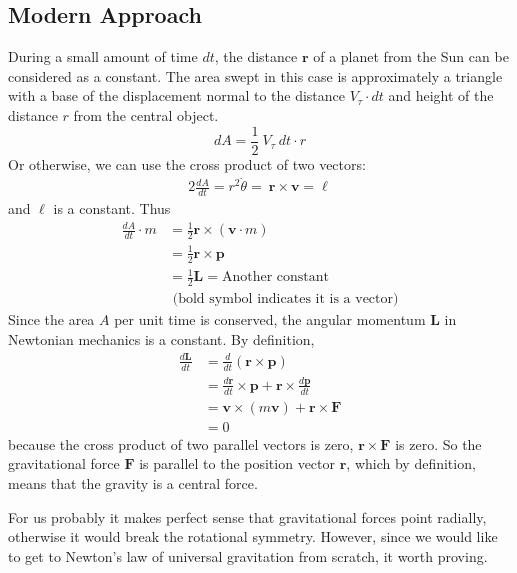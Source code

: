 \documentclass{article}
\begin{document}
\subsection{Modern Approach}
During a small amount of time $dt$, the distance $\boldsymbol{r}$ of a planet from the Sun can be considered as a constant. The area swept in this case is approximately a triangle with a base of the displacement normal to the distance $V_\tau \cdot dt$ and height of the distance $r$ from the central object. 
\[dA = \frac{1}{2}\ V_\tau\ dt\cdot r\]
Or otherwise, we can use the cross product of two vectors:
\begin{align*}
    \label{eq:1}
    2\frac{dA}{dt}  = r^2 \dot{\theta} = \ \boldsymbol{r} \times \boldsymbol{v} = \ell
\end{align*}
and $\ell$ is a constant. Thus
\begin{align*}
    \frac{dA}{dt}\cdot m & =  \frac{1}{2}\boldsymbol{r} \times (\boldsymbol{v} \cdot m) 
    \\ & = \frac{1}{2}\boldsymbol{r} \times \boldsymbol{p} 
    \\ & = \frac{1}{2} \boldsymbol{L} = \text{Another constant}
    \\ & \text{ (bold symbol indicates it is a vector)}
\end{align*}
Since the area $A$ per unit time is conserved, the angular momentum $\boldsymbol{L}$ in Newtonian mechanics is a constant. 
By definition,
\begin{align*}
    \frac{d\boldsymbol{L}}{dt} & = \frac{d}{dt} (\boldsymbol{r} \times \boldsymbol{p})
    \\ &  = \frac{d\boldsymbol{r}}{dt} \times \boldsymbol{p} + \boldsymbol{r} \times \frac{d\boldsymbol{p}}{dt} 
    \\ & = \boldsymbol{v} \times (m\boldsymbol{v}) + \boldsymbol{r} \times \boldsymbol{F} 
    \\ & = 0
\end{align*}
because the cross product of two parallel vectors is zero, $\boldsymbol{r} \times \boldsymbol{F}$ is zero. So the gravitational force $\boldsymbol{F}$ is parallel to the position vector $\boldsymbol{r}$, which by definition, means that the gravity is a central force\autocite{Morin2008}. 

For us probably it makes perfect sense that gravitational forces point radially, otherwise it would break the rotational symmetry. However, since we would like to get to Newton's law of universal gravitation from scratch, it worth proving.
\end{document}

